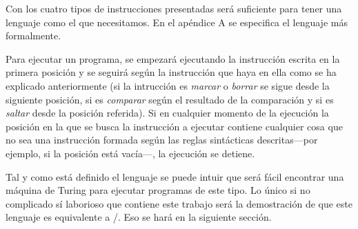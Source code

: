 %
Con los cuatro tipos de instrucciones presentadas será suficiente para tener una lenguaje como el
que necesitamos. En el apéndice A se especifica el lenguaje más formalmente.

Para ejecutar un programa, se empezará ejecutando la instrucción escrita en la primera posición y se
seguirá según la instrucción que haya en ella como se ha explicado anteriormente (si la intrucción
es {\it marcar} o {\it borrar} se sigue desde la siguiente posición, si es {\it comparar} según el
resultado de la comparación y si es {\it saltar} desde la posición referida). Si en cualquier
momento de la ejecución la posición en la que se busca la instrucción a ejecutar contiene cualquier
cosa que no sea una instrucción formada según las reglas sintácticas descritas---por ejemplo, si la
posición está vacía---, la ejecución se detiene.

Tal y como está definido el lenguaje se puede intuir que será fácil encontrar una máquina de Turing
para ejecutar programas de este tipo. Lo único si no complicado sí laborioso que contiene este
trabajo será la demostración de que este lenguaje es equivalente a \C/. Eso se hará en la siguiente
sección.
